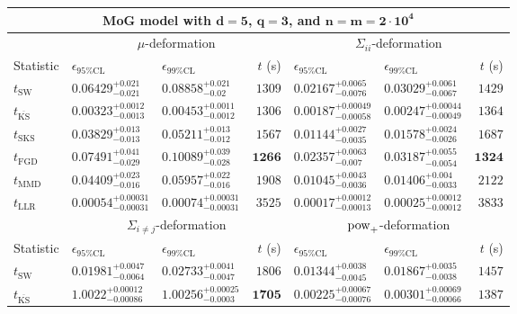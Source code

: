 \begin{tabular}{l|llr|llr}
	\toprule
	\multicolumn{7}{c}{{\bf MoG model with $\mathbf{d=5}$, $\mathbf{q=3}$, and $\mathbf{n=m=2\cdot 10^{4}}$}} \\
	\toprule
	\multicolumn{1}{c}{} & \multicolumn{3}{c}{$\mu$-deformation} & \multicolumn{3}{c}{$\Sigma_{ii}$-deformation} \\
	Statistic & $\epsilon_{95\%\mathrm{CL}}$ & $\epsilon_{99\%\mathrm{CL}}$ & $t$ (s) & $\epsilon_{95\%\mathrm{CL}}$ & $\epsilon_{99\%\mathrm{CL}}$ & $t$ (s) \\
	\midrule
	$t_{\mathrm{SW}}$ & $0.06429_{-0.021}^{+0.021}$ & $0.08858_{-0.02}^{+0.021}$ & $1309$ & $0.02167_{-0.0076}^{+0.0065}$ & $0.03029_{-0.0067}^{+0.0061}$ & $1429$ \\
	$t_{\overline{\mathrm{KS}}}$ & ${\mathbf{0.00323_{-0.0013}^{+0.0012}}}$ & ${\mathbf{0.00453_{-0.0012}^{+0.0011}}}$ & $1306$ & ${\mathbf{0.00187_{-0.00058}^{+0.00049}}}$ & ${\mathbf{0.00247_{-0.00049}^{+0.00044}}}$ & $1364$ \\
	$t_{\mathrm{SKS}}$ & $0.03829_{-0.013}^{+0.013}$ & $0.05211_{-0.012}^{+0.013}$ & $1567$ & $0.01144_{-0.0035}^{+0.0027}$ & $0.01578_{-0.0026}^{+0.0024}$ & $1687$ \\
	$t_{\mathrm{FGD}}$ & $0.07491_{-0.029}^{+0.041}$ & $0.10089_{-0.028}^{+0.039}$ & ${\mathbf{1266}}$ & $0.02357_{-0.007}^{+0.0063}$ & $0.03187_{-0.0054}^{+0.0055}$ & ${\mathbf{1324}}$ \\
	$t_{\mathrm{MMD}}$ & $0.04409_{-0.016}^{+0.023}$ & $0.05957_{-0.016}^{+0.022}$ & $1908$ & $0.01045_{-0.0036}^{+0.0043}$ & $0.01406_{-0.0033}^{+0.004}$ & $2122$ \\
	$t_{\mathrm{LLR}}$ & $0.00054_{-0.00031}^{+0.00031}$ & $0.00074_{-0.00031}^{+0.00031}$ & $3525$ & $0.00017_{-0.00013}^{+0.00012}$ & $0.00025_{-0.00012}^{+0.00012}$ & $3833$ \\
	\toprule
	\multicolumn{1}{c}{} & \multicolumn{3}{c}{$\Sigma_{i\neq j}$-deformation} & \multicolumn{3}{c}{$\rm{pow}_{+}$-deformation} \\
	Statistic & $\epsilon_{95\%\mathrm{CL}}$ & $\epsilon_{99\%\mathrm{CL}}$ & $t$ (s) & $\epsilon_{95\%\mathrm{CL}}$ & $\epsilon_{99\%\mathrm{CL}}$ & $t$ (s) \\
	\midrule
	$t_{\mathrm{SW}}$ & $0.01981_{-0.0064}^{+0.0047}$ & $0.02733_{-0.0047}^{+0.0041}$ & $1806$ & $0.01344_{-0.0045}^{+0.0038}$ & $0.01867_{-0.0038}^{+0.0035}$ & $1457$ \\
	$t_{\overline{\mathrm{KS}}}$ & $1.0022_{-0.00086}^{+0.00012}$ & $1.00256_{-0.0003}^{+0.00025}$ & ${\mathbf{1705}}$ & ${\mathbf{0.00225_{-0.00076}^{+0.00067}}}$ & ${\mathbf{0.00301_{-0.00066}^{+0.00069}}}$ & $1387$ \\

\end{tabular}
